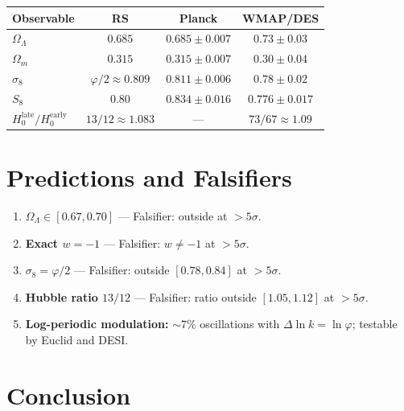 \documentclass[12pt,a4paper]{article}
\theoremstyle{definition}
\theoremstyle{remark}
\begin{document}
\begin{center}
\renewcommand{\arraystretch}{1.3}
\begin{tabular}{lccc}
\hline
\textbf{Observable} & \textbf{RS} & \textbf{Planck} & \textbf{WMAP/DES} \\
\hline
$\Omega_\Lambda$ & $0.685$ & $0.685 \pm 0.007$ & $0.73 \pm 0.03$ \\
$\Omega_m$ & $0.315$ & $0.315 \pm 0.007$ & $0.30 \pm 0.04$ \\
$\sigma_8$ & $\varphi/2 \approx 0.809$ & $0.811 \pm 0.006$ & $0.78 \pm 0.02$ \\
$S_8$ & $0.80$ & $0.834 \pm 0.016$ & $0.776 \pm 0.017$ \\
$H_0^{\mathrm{late}}/H_0^{\mathrm{early}}$ & $13/12 \approx 1.083$ & --- & $73/67 \approx 1.09$ \\
\hline
\end{tabular}
\end{center}

\section{Predictions and Falsifiers}
\label{sec:predictions}

\begin{enumerate}
  \item \textbf{$\Omega_\Lambda \in [0.67, 0.70]$} --- Falsifier:
  outside at $> 5\sigma$.
  \item \textbf{Exact $w = -1$} --- Falsifier: $w \neq -1$ at $> 5\sigma$.
  \item \textbf{$\sigma_8 = \varphi/2$} --- Falsifier: outside
  $[0.78, 0.84]$ at $> 5\sigma$.
  \item \textbf{Hubble ratio $13/12$} --- Falsifier: ratio outside
  $[1.05, 1.12]$ at $> 5\sigma$.
  \item \textbf{Log-periodic modulation:} $\sim 7\%$ oscillations
  with $\Delta\ln k = \ln\varphi$; testable by Euclid and DESI.
\end{enumerate}

\section{Conclusion}
\label{sec:conclusion}
\end{document}
